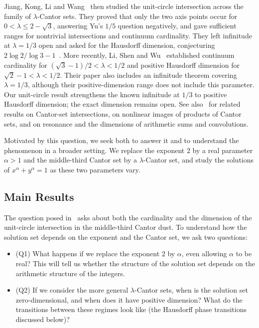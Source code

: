 \documentclass[11pt,a4paper]{amsart}
\numberwithin{equation}{section}
\theoremstyle{definition}
\begin{document}
Jiang, Kong, Li and Wang~\cite{Jiang2026} then studied the unit-circle
intersection across the family of \(\lambda\)-Cantor sets. They proved
that only the two axis points occur for \(0<\lambda\leq2-\sqrt3\),
answering Yu's \(1/5\) question negatively, and gave sufficient ranges
for nontrivial intersections and continuum cardinality. They left
infinitude at \(\lambda=1/3\) open and asked for the Hausdorff dimension,
conjecturing \(2\log2/\log3-1\)~\cite[Question~5.1]{Jiang2026}.
More recently, Li, Shen and Wu~\cite{LiShenWu2026} established continuum
cardinality for \((\sqrt3-1)/2<\lambda<1/2\) and positive Hausdorff
dimension for \(\sqrt2-1<\lambda<1/2\). Their paper also includes an
infinitude theorem covering \(\lambda=1/3\), although their
positive-dimension range does not include this parameter. Our
unit-circle result strengthens the known infinitude at \(1/3\) to
positive Hausdorff dimension; the exact dimension remains open.
See also~\cite{HuntKanYorke1993,FengHuangRao2014,HuangKong2023}
for related results on Cantor-set intersections,
\cite{JiangNonlinear,McDonaldTaylor,MoreiraImages} on nonlinear images
of products of Cantor sets, and
\cite{PeresShmerkin2009,NazarovPeresShmerkin} on resonance and the
dimensions of arithmetic sums and convolutions.

Motivated by this question, we seek both to answer it and to understand
the phenomenon in a broader setting.
We replace the exponent \(2\) by a real parameter \(\alpha>1\) and the
middle-third Cantor set by a \(\lambda\)-Cantor set, and study the
solutions of \(x^\alpha+y^\alpha=1\) as these two parameters vary.








\subsection{Main Results}\label{subsec:main-results}


The question posed in~\cite{Jiang2026} asks about both the cardinality
and the dimension of the unit-circle intersection in the middle-third
Cantor dust. To understand how the solution set depends on the exponent
and the Cantor set, we ask two questions:
\begin{itemize}
\item (Q1) What happens if we replace the exponent \(2\) by \(\alpha\), even
allowing \(\alpha\) to be real? This will tell us whether the structure of
the solution set depends on the arithmetic structure of the integers.
\item (Q2) If we consider the more general \(\lambda\)-Cantor sets, when
is the solution set zero-dimensional, and when does it have positive
dimension? What do the transitions between these regimes look like
(the Hausdorff phase transitions discussed below)?
\end{itemize}
\end{document}
